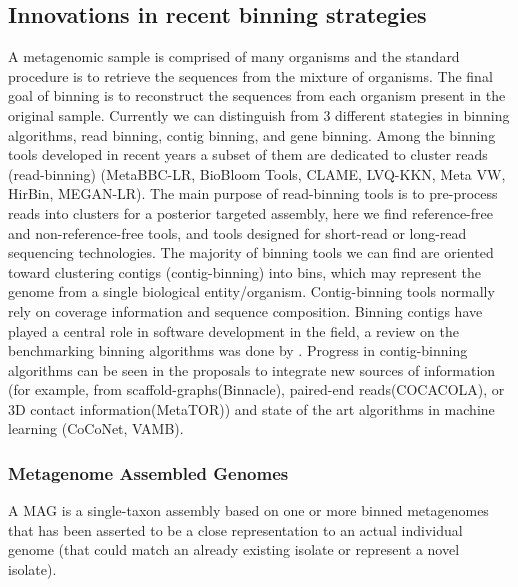 \documentclass{article}
\begin{document}
\subsection{Innovations in recent binning strategies}
A metagenomic sample is comprised of many organisms and the standard procedure is to retrieve the sequences from the mixture of organisms.
The final goal of binning is to reconstruct the sequences from each organism present in the original sample.
Currently we can distinguish from 3 different stategies in binning algorithms, read binning, contig binning, and gene binning.
Among the binning tools developed in recent years a subset of them are dedicated to cluster reads (read-binning) (MetaBBC-LR, BioBloom Tools, CLAME, LVQ-KKN, Meta VW, HirBin, MEGAN-LR).
The main purpose of read-binning tools is to pre-process reads into clusters for a posterior targeted assembly, here we find reference-free and non-reference-free tools, and tools designed for short-read or long-read sequencing technologies.
The majority of binning tools we can find are oriented toward clustering contigs (contig-binning) into bins, which may represent the genome from a single biological entity/organism.
Contig-binning tools normally rely on coverage information and sequence composition. 
Binning contigs have played a central role in software development in the field, a review on the benchmarking binning algorithms was done by .
Progress in contig-binning algorithms can be seen in the proposals to integrate new sources of information (for example, from scaffold-graphs(Binnacle), paired-end reads(COCACOLA), or 3D contact information(MetaTOR)) and state of the art algorithms in machine learning (CoCoNet, \gls{VAMB}).

\subsubsection{Metagenome Assembled Genomes}
A \gls{MAG} is a single-taxon assembly based on one or more binned metagenomes that has been asserted to be a close representation to an actual individual genome (that could match an already existing isolate or represent a novel isolate).
\end{document}
